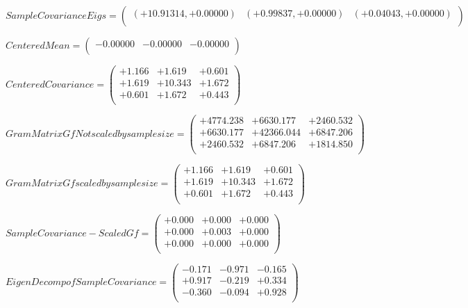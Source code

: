 \documentclass[9pt]{article}
\theoremstyle{plain}
\theoremstyle{definition}
\theoremstyle{remark}
\numberwithin{equation}{section}
\begin{document}
$Sample Covariance Eigs = \left(
\begin{array}{
ccc}
(+10.91314,+0.00000) & (+0.99837,+0.00000) & (+0.04043,+0.00000) \\
\end{array}
\right)$ \newline 

$Centered Mean = \left(
\begin{array}{
ccc}
-0.00000 & -0.00000 & -0.00000 \\
\end{array}
\right)$ \newline 

$Centered Covariance = \left(
\begin{array}{
ccc}
+1.166 & +1.619 & +0.601 \\
+1.619 & +10.343 & +1.672 \\
+0.601 & +1.672 & +0.443 \\
\end{array}
\right)$ \newline 

$Gram Matrix Gf Not scaled by sample size = \left(
\begin{array}{
ccc}
+4774.238 & +6630.177 & +2460.532 \\
+6630.177 & +42366.044 & +6847.206 \\
+2460.532 & +6847.206 & +1814.850 \\
\end{array}
\right)$ \newline 

$Gram Matrix Gf  scaled by sample size = \left(
\begin{array}{
ccc}
+1.166 & +1.619 & +0.601 \\
+1.619 & +10.343 & +1.672 \\
+0.601 & +1.672 & +0.443 \\
\end{array}
\right)$ \newline 

$SampleCovariance - Scaled Gf = \left(
\begin{array}{
ccc}
+0.000 & +0.000 & +0.000 \\
+0.000 & +0.003 & +0.000 \\
+0.000 & +0.000 & +0.000 \\
\end{array}
\right)$ \newline 

$EigenDecomp of SampleCovariance = \left(
\begin{array}{
ccc}
-0.171 & -0.971 & -0.165 \\
+0.917 & -0.219 & +0.334 \\
-0.360 & -0.094 & +0.928 \\
\end{array}
\right)$ \newline 
\end{document}
